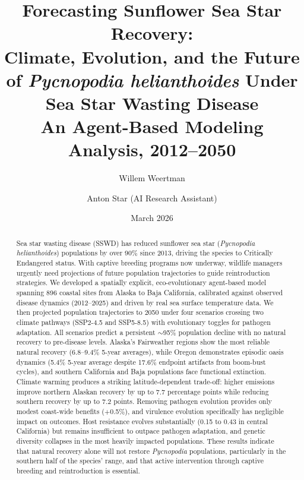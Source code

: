 \documentclass[11pt]{article}
\title{\textbf{Forecasting Sunflower Sea Star Recovery:\\Climate, Evolution, and the Future of \textit{Pycnopodia helianthoides} Under Sea Star Wasting Disease}\\[0.5em]\Large An Agent-Based Modeling Analysis, 2012--2050}
\author{Willem Weertman \and Anton Star (AI Research Assistant)}
\date{March 2026}
\begin{document}
\maketitle

\begin{abstract}
Sea star wasting disease (SSWD) has reduced sunflower sea star (\textit{Pycnopodia helianthoides}) populations by over 90\% since 2013, driving the species to Critically Endangered status. With captive breeding programs now underway, wildlife managers urgently need projections of future population trajectories to guide reintroduction strategies. We developed a spatially explicit, eco-evolutionary agent-based model spanning 896 coastal sites from Alaska to Baja California, calibrated against observed disease dynamics (2012--2025) and driven by real sea surface temperature data. We then projected population trajectories to 2050 under four scenarios crossing two climate pathways (SSP2-4.5 and SSP5-8.5) with evolutionary toggles for pathogen adaptation. All scenarios predict a persistent $\sim$95\% population decline with no natural recovery to pre-disease levels. Alaska's Fairweather regions show the most reliable natural recovery (6.8--9.4\% 5-year averages), while Oregon demonstrates episodic oasis dynamics (5.4\% 5-year average despite 17.6\% endpoint artifacts from boom-bust cycles), and southern California and Baja populations face functional extinction. Climate warming produces a striking latitude-dependent trade-off: higher emissions improve northern Alaskan recovery by up to 7.7 percentage points while reducing southern recovery by up to 7.2 points. Removing pathogen evolution provides only modest coast-wide benefits ($+$0.5\%), and virulence evolution specifically has negligible impact on outcomes. Host resistance evolves substantially (0.15 to 0.43 in central California) but remains insufficient to outpace pathogen adaptation, and genetic diversity collapses in the most heavily impacted populations. These results indicate that natural recovery alone will not restore \textit{Pycnopodia} populations, particularly in the southern half of the species' range, and that active intervention through captive breeding and reintroduction is essential.
\end{abstract}

\tableofcontents
\newpage


\end{document}
